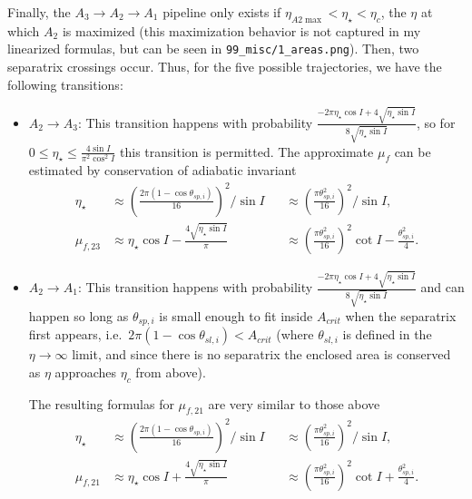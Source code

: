 \documentclass[11pt,
        usenames, %
        dvipsnames %
    ]{article}
\newcommand*{\p}[1]{\left(#1\right)}
\begin{document}
Finally, the $A_3 \to A_2 \to A_1$ pipeline only exists if $ \eta_{A2\max} <
\eta_\star < \eta_c$, the $\eta$ at which $A_2$ is maximized (this maximization
behavior is not captured in my linearized formulas, but can be seen in
\lstinline{99_misc/1_areas.png}). Then, two separatrix crossings occur. Thus, for
the five possible trajectories, we have the following transitions:
\begin{itemize}
    \item $A_2 \to A_3$: This transition happens with probability $\frac{-2\pi
        \eta_{\star} \cos I + 4\sqrt{\eta_{\star}\sin
        I}}{8\sqrt{\eta_{\star}\sin I}}$, so for $0 \leq \eta_{\star} \leq
        \frac{4\sin I}{\pi^2 \cos^2 I}$ this transition is permitted. The
        approximate $\mu_f$ can be estimated by conservation of adiabatic
        invariant
        \begin{align*}
            \eta_\star &\approx \p{\frac{2\pi\p{1 - \cos \theta_{sp,i}}}{
                        16}}^2 / \sin I&
                    &\approx \p{\frac{\pi \theta_{sp, i}^2}{16}}^2/\sin I,\\
            \mu_{f, 23} &\approx \eta_\star \cos I
                    - \frac{4\sqrt{\eta_\star \sin I}}{\pi} &
                &\approx\p{\frac{\pi \theta_{sp, i}^2}{16}}^2 \cot I
                    - \frac{\theta_{sp, i}^2}{4}.
        \end{align*}

    \item $A_2 \to A_1$: This transition happens with probability $\frac{-2\pi
        \eta_{\star} \cos I + 4\sqrt{\eta_{\star}\sin
        I}}{8\sqrt{\eta_{\star}\sin I}}$ and can happen so long as $\theta_{sp,
        i}$ is small enough to fit inside $A_{crit}$ when the separatrix first
        appears, i.e.\ $2\pi\p{1 - \cos \theta_{sl, i}} < A_{crit}$ (where
        $\theta_{sl, i}$ is defined in the $\eta \to \infty$ limit, and since
        there is no separatrix the enclosed area is conserved as $\eta$
        approaches $\eta_c$ from above).

        The resulting formulas for $\mu_{f, 21}$ are very similar to those above
        \begin{align*}
            \eta_\star &\approx \p{\frac{2\pi\p{1 - \cos \theta_{sp,i}}}{
                        16}}^2 / \sin I&
                    &\approx \p{\frac{\pi \theta_{sp, i}^2}{16}}^2/\sin I,\\
            \mu_{f, 21} &\approx \eta_\star \cos I
                    + \frac{4\sqrt{\eta_\star \sin I}}{\pi} &
                &\approx\p{\frac{\pi \theta_{sp, i}^2}{16}}^2 \cot I
                    + \frac{\theta_{sp, i}^2}{4}.
        \end{align*}


\end{itemize}
\end{document}
